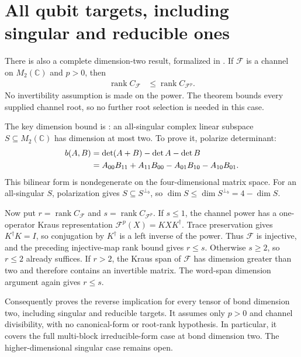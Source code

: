 \documentclass{article}
\begin{document}
\section{All qubit targets, including singular and reducible ones}

There is also a complete dimension-two result, formalized in
.
If $\mathcal F$ is a channel on $M_2(\mathbb C)$ and $p>0$, then
\begin{align}
 \operatorname{rank}C_{\mathcal F}
 &\le \operatorname{rank}C_{\mathcal F^p}.
 \label{eq:dccsp17_qubit_root_rank}
\end{align}
No invertibility assumption is made on the power. The theorem
 bounds every
supplied channel root, so no further root selection is needed in this case.

The key dimension bound is
:
an all-singular complex linear subspace $S\subseteq M_2(\mathbb C)$ has
dimension at most two. To prove it, polarize determinant:
\begin{align}
 b(A,B)&=\det(A+B)-\det A-\det B\notag\\
 &=A_{00}B_{11}+A_{11}B_{00}-A_{01}B_{10}-A_{10}B_{01}.
 \label{eq:dccsp17_qubit_singular_polarization}
\end{align}
This bilinear form is nondegenerate on the four-dimensional matrix space.
For an all-singular $S$, polarization gives $S\subseteq S^{\perp_b}$,
so $\dim S\le\dim S^{\perp_b}=4-\dim S$.

Now put $r=\operatorname{rank}C_{\mathcal F}$ and
$s=\operatorname{rank}C_{\mathcal F^p}$. If $s\le1$, the channel power has
a one-operator Kraus representation $\mathcal F^p(X)=KXK^\dagger$.
Trace preservation gives $K^\dagger K=I$, so conjugation by $K^\dagger$
is a left inverse of the power. Thus $\mathcal F$ is injective, and the
preceding injective-map rank bound gives $r\le s$.
Otherwise $s\ge2$, so $r\le2$ already suffices. If $r>2$, the Kraus span
of $\mathcal F$ has dimension greater than two and therefore contains an
invertible matrix. The word-span dimension argument again gives $r\le s$.

Consequently
proves the reverse implication for every tensor of bond dimension two,
including singular and reducible targets. It assumes only $p>0$ and channel
divisibility, with no canonical-form or root-rank hypothesis. In particular,
it covers the full multi-block irreducible-form case at bond dimension two.
The higher-dimensional singular case remains open.
\end{document}
